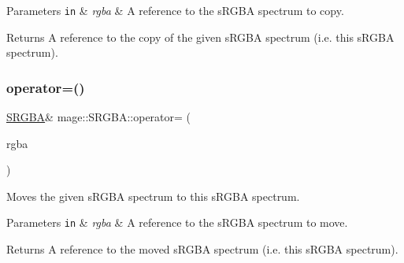 \begin{DoxyParams}[1]{Parameters}
\mbox{\tt in}  & {\em rgba} & A reference to the s\+R\+G\+BA spectrum to copy. \\
\hline
\end{DoxyParams}
\begin{DoxyReturn}{Returns}
A reference to the copy of the given s\+R\+G\+BA spectrum (i.\+e. this s\+R\+G\+BA spectrum). 
\end{DoxyReturn}
\hypertarget{structmage_1_1_s_r_g_b_a_ad64e06906eb8ae30f6e4fb58d452ad7c}{}\label{structmage_1_1_s_r_g_b_a_ad64e06906eb8ae30f6e4fb58d452ad7c} 
\subsubsection{\texorpdfstring{operator=()}{operator=()}\hspace{0.1cm}{\footnotesize\ttfamily [2/2]}}
{\footnotesize\ttfamily \hyperlink{structmage_1_1_s_r_g_b_a}{S\+R\+G\+BA}\& mage\+::\+S\+R\+G\+B\+A\+::operator= (\begin{DoxyParamCaption}\item[{\hyperlink{structmage_1_1_s_r_g_b_a}{S\+R\+G\+BA} \&\&}]{rgba }\end{DoxyParamCaption})\hspace{0.3cm}{\ttfamily [default]}}

Moves the given s\+R\+G\+BA spectrum to this s\+R\+G\+BA spectrum.


\begin{DoxyParams}[1]{Parameters}
\mbox{\tt in}  & {\em rgba} & A reference to the s\+R\+G\+BA spectrum to move. \\
\hline
\end{DoxyParams}
\begin{DoxyReturn}{Returns}
A reference to the moved s\+R\+G\+BA spectrum (i.\+e. this s\+R\+G\+BA spectrum). 
\end{DoxyReturn}
